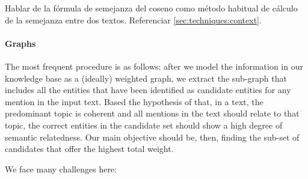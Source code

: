 {\color{red} Hablar de la fórmula de semejanza del coseno como método habitual de cálculo de la semejanza entre dos textos. Referenciar \autoref{sec:techniques:context}.}

\paragraph{Graphs}

The most frequent procedure is as follows: after we model the information in our knowledge base as a (ideally) weighted graph, we extract the sub-graph that includes all the entities that have been identified as candidate entities for any mention in the input text. Based the hypothesis of that, in a text, the predominant topic is coherent and all mentions in the text should relate to that topic, the correct entities in the candidate set should show a high degree of semantic relatedness. Our main objective should be, then, finding the sub-set of candidates that offer the highest total weight.

We face many challenges here:

